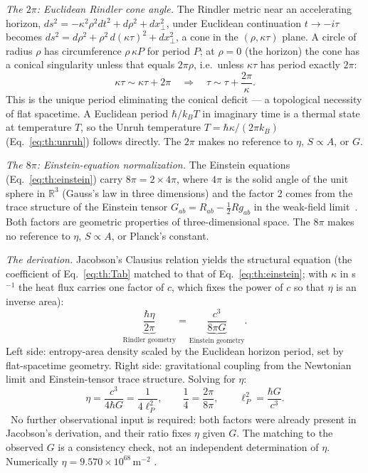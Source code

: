 \emph{The $2\pi$: Euclidean Rindler cone angle.} The Rindler metric near an accelerating horizon, $ds^2=-\kappa^2\rho^2dt^2+d\rho^2+dx_\perp^2$, under
Euclidean continuation $t\to-i\tau$ becomes $ds^2=d\rho^2+\rho^2\,d(\kappa\tau)^2+dx_\perp^2$, a cone in the $(\rho,\kappa\tau)$ plane. A circle of
radius $\rho$ has circumference $\rho\,\kappa P$ for period $P$; at $\rho=0$ (the horizon) the cone has a conical singularity unless that equals
$2\pi\rho$, i.e.\ unless $\kappa\tau$ has period exactly $2\pi$:
\begin{equation}\kappa\tau\sim\kappa\tau+2\pi\quad\Longrightarrow\quad\tau\sim\tau+\frac{2\pi}{\kappa}.\label{eq:th:period}\end{equation}
This is the unique period eliminating the conical deficit --- a topological necessity of flat spacetime. A Euclidean period $\hbar/k_BT$ in imaginary
time is a thermal state at temperature $T$, so the Unruh temperature $T=\hbar\kappa/(2\pi k_B)$ (Eq.~\eqref{eq:th:unruh}) follows directly. The $2\pi$ makes no
reference to $\eta$, $S\propto A$, or $G$. \derived

\emph{The $8\pi$: Einstein-equation normalization.} The Einstein equations (Eq.~\eqref{eq:th:einstein}) carry $8\pi=2\times4\pi$, where $4\pi$ is the solid angle of
the unit sphere in $\mathbb R^3$ (Gauss's law in three dimensions) and the factor 2 comes from the trace structure of the Einstein tensor
$G_{ab}=R_{ab}-\tfrac12Rg_{ab}$ in the weak-field limit~\cite{Wald1984}. Both factors are geometric properties of three-dimensional space. The $8\pi$ makes
no reference to $\eta$, $S\propto A$, or Planck's constant. \derived

\emph{The derivation.} Jacobson's Clausius relation yields the structural equation (the coefficient of Eq.~\eqref{eq:th:Tab} matched to that of
Eq.~\eqref{eq:th:einstein}; with $\kappa$ in s$^{-1}$ the heat flux carries one factor of $c$, which fixes the power of $c$ so that $\eta$ is an inverse
area):
\begin{equation}\underbrace{\frac{\hbar\eta}{2\pi}}_{\text{Rindler geometry}}=\underbrace{\frac{c^3}{8\pi G}}_{\text{Einstein geometry}} .\label{eq:th:structural}\end{equation}
Left side: entropy-area density scaled by the Euclidean horizon period, set by flat-spacetime geometry. Right side: gravitational coupling from the
Newtonian limit and Einstein-tensor trace structure. Solving for $\eta$:
\begin{equation}\eta=\frac{c^3}{4\hbar G}=\frac{1}{4\ell_P^2},\qquad\frac14=\frac{2\pi}{8\pi},\qquad \ell_P^2=\frac{\hbar G}{c^3}.\label{eq:th:eta}\end{equation}
\derived\ No further observational input is required: both factors were already present in Jacobson's derivation, and their ratio fixes $\eta$ given $G$.
The matching to the observed $G$ is a consistency check, not an independent determination of $\eta$. Numerically $\eta=9.570\times10^{68}$\,m$^{-2}$ \calc.

